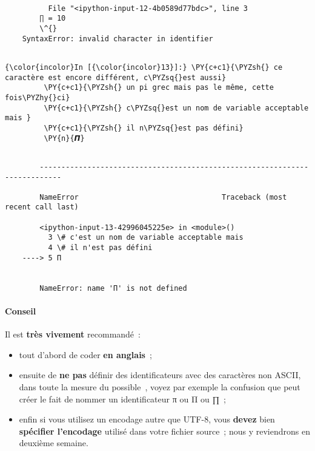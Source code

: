     \begin{Verbatim}[commandchars=\\\{\}]

          File "<ipython-input-12-4b0589d77bdc>", line 3
        ∏ = 10
        \^{}
    SyntaxError: invalid character in identifier


    \end{Verbatim}

    \begin{Verbatim}[commandchars=\\\{\}]
{\color{incolor}In [{\color{incolor}13}]:} \PY{c+c1}{\PYZsh{} ce caractère est encore différent, c\PYZsq{}est aussi}
         \PY{c+c1}{\PYZsh{} un pi grec mais pas le même, cette fois\PYZhy{}ci}
         \PY{c+c1}{\PYZsh{} c\PYZsq{}est un nom de variable acceptable mais }
         \PY{c+c1}{\PYZsh{} il n\PYZsq{}est pas défini}
         \PY{n}{𝞟}
\end{Verbatim}


    \begin{Verbatim}[commandchars=\\\{\}]

        ---------------------------------------------------------------------------

        NameError                                 Traceback (most recent call last)

        <ipython-input-13-42996045225e> in <module>()
          3 \# c'est un nom de variable acceptable mais
          4 \# il n'est pas défini
    ----> 5 Π
    

        NameError: name 'Π' is not defined

    \end{Verbatim}

    \hypertarget{conseil}{%
\paragraph{Conseil}\label{conseil}}

Il est \textbf{très vivement} recommandé~:

\begin{itemize}
\tightlist
\item
  tout d'abord de coder \textbf{en anglais}~;
\item
  ensuite de \textbf{ne pas} définir des identificateurs avec des
  caractères non ASCII, dans toute la mesure du possible~, voyez par
  exemple la confusion que peut créer le fait de nommer un
  identificateur π ou Π ou ∏~;
\item
  enfin si vous utilisez un encodage autre que UTF-8, vous
  \textbf{devez} bien \textbf{spécifier l'encodage} utilisé dans votre
  fichier source~; nous y reviendrons en deuxième semaine.
\end{itemize}

